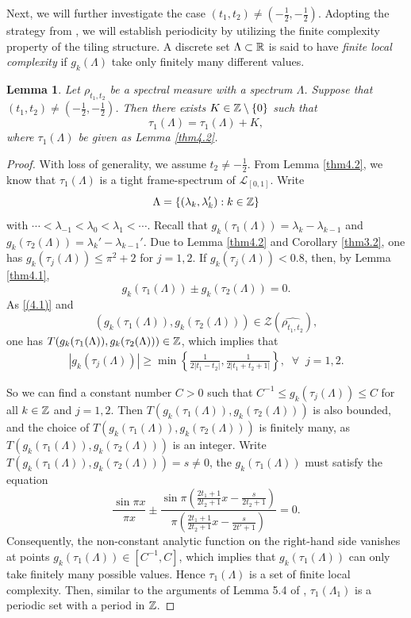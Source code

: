 \documentclass[12pt,psfig,reqno]{amsart}
\numberwithin{equation}{section}
\theoremstyle{plain}
\newtheorem{lem}[thm]{Lemma}
\begin{document}
Next, we will further investigate the case \( (t_1,t_2)\neq(-\frac12,-\frac12) \). Adopting the strategy from \cite{KW25}, we will establish periodicity by utilizing the finite complexity property of the tiling structure. 
A discrete set $\Lambda\subset\Bbb R$ is said to have \textit{finite local complexity} if $g_k(\Lambda)$ take only finitely many different values. 
\begin{lem}\label{thm4.4}
		Let $\rho_{t_1,t_2}$ be a spectral measure with a spectrum $\Lambda$. 
		Suppose that $(t_1,t_2)\neq(-\frac12,-\frac12)$.
	Then there exists $K\in\Bbb Z\setminus\{0\}$ such that  $$\tau_1(\Lambda)=\tau_1(\Lambda)+K, 
	$$ 
	where $\tau_1(\Lambda)$ be given as Lemma  \ref{thm4.2}.
\end{lem}
\begin{proof}
	With loss of generality, we assume $t_2\neq-\frac12$. 
	From Lemma \ref{thm4.2}, we know that $\tau_1(\Lambda)$ is a tight frame-spectrum of $\mathcal{L}_{[0,1]}$. 
	Write $$
	\Lambda=\{(\lambda_k,\lambda_k'):k\in\Bbb Z\}
	$$
	with $\cdots<\lambda_{-1}<\lambda_0<\lambda_1<\cdots$. 
	Recall that $g_k(\tau_1(\Lambda))=\lambda_k-\lambda_{k-1}$ and $g_k(\tau_2(\Lambda))=\lambda_k'-\lambda_{k-1}'$. 
	Due to Lemma \ref{thm4.2} and Corollary \ref{thm3.2}, one has 
	$g_{k}(\tau_j(\Lambda))\leq \pi^2+2$ for $j=1,2$. 
	If $g_{k}(\tau_j(\Lambda))<0.8$, then, by Lemma \ref{thm4.1}, $$
	g_{k}(\tau_1(\Lambda))\pm g_{k}(\tau_2(\Lambda))=0. 
	$$
	As \eqref{(4.1)} and  $$(g_{k}(\tau_1(\Lambda)),g_{k}(\tau_2(\Lambda)))\in\mathcal{Z}(\widehat{\rho_{t_1,t_2}}), $$
	one has $T(g_{k}(\tau_1(\Lambda)),g_{k}(\tau_2(\Lambda)))\in\Bbb Z$, which implies that 
	\begin{align*}
		|g_{k}(\tau_j(\Lambda))| \geq \min\left\{\frac{1}{2|t_1-t_2|}, \frac{1}{2|t_1+t_2+1|}\right\},\;\;\forall\;\;j=1,2.
	\end{align*}
	
	So we can find a constant number $C>0$ such that $C^{-1}\leq g_k(\tau_j(\Lambda))\leq C$ for all $k\in\Bbb Z$ and $j=1,2$. 
	Then $T(g_k(\tau_1(\Lambda)),g_k(\tau_2(\Lambda)))$ is also bounded, and the choice of $T(g_k(\tau_1(\Lambda)),g_k(\tau_2(\Lambda)))$ is finitely many, as $T(g_k(\tau_1(\Lambda)),g_k(\tau_2(\Lambda)))$ is an integer.  Write $T(g_k(\tau_1(\Lambda)),g_k(\tau_2(\Lambda)))=s\neq0$, the $g_k(\tau_1(\Lambda))$ must satisfy 
	the equation $$
	\frac{\sin\pi x}{\pi x}\pm \frac{\sin\pi(\frac{2t_1+1}{2t_2+1}x-\frac{s}{2t_2+1})}{\pi(\frac{2t_1+1}{2t_2+1}x-\frac{s}{2t'+1})}=0.
	$$
	Consequently, the non-constant analytic function on the right-hand side vanishes at points $g_k(\tau_1(\Lambda)) \in [C^{-1}, C]$, which implies that $g_k(\tau_1(\Lambda))$ can only take finitely many possible values. 
	Hence $\tau_1(\Lambda)$ is a set of finite local complexity. 
	Then, similar to the arguments of Lemma 5.4 of \cite{KW25}, $\tau_1(\Lambda_1)$ is a periodic set with a period in $\Bbb Z$. 
\end{proof}
\end{document}
